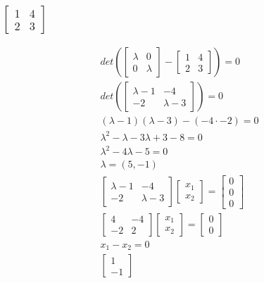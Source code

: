 \documentclass[12pt, a4paper]{article}
\begin{document}
			\subsubsection{$\begin{bmatrix}1&4\\2&3\end{bmatrix}$}
				\begin{align*}
					det(\begin{bmatrix}\lambda & 0\\0&\lambda \end{bmatrix}-\begin{bmatrix}1&4\\2&3\end{bmatrix})=0\\
					det(\begin{bmatrix}\lambda-1 & -4\\ -2 & \lambda -3\end{bmatrix})=0\\
					(\lambda-1)(\lambda-3)-(-4\cdot -2)=0\\
					\lambda^2-\lambda-3\lambda+3-8=0\\
					\lambda^2-4\lambda-5=0\\
					\lambda=(5,-1)\\[4mm]
					\begin{bmatrix}\lambda-1 & -4\\ -2 & \lambda -3\end{bmatrix}\begin{bmatrix}x_1\\x_2\end{bmatrix}=\begin{bmatrix}0\\0\\0\end{bmatrix}\\
					\begin{bmatrix}4 & -4\\ -2 & 2 \end{bmatrix}\begin{bmatrix}x_1\\x_2\end{bmatrix}=\begin{bmatrix}0\\0\end{bmatrix}\\
					x_1-x_2=0\\
					\begin{bmatrix}1\\-1\end{bmatrix}\\

\end{align*}
\end{document}

